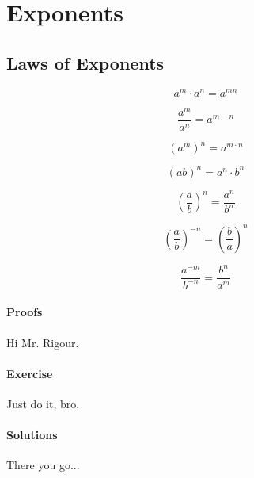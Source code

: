 \section{Exponents}

\subsection*{Laws of Exponents}
$$
a^{m} \cdot a^{n} = a^{mn}
$$

$$
\frac{a^{m}}{a^{n}} = a^{m-n}
$$

$$
\left( a^{m} \right)^{n} = a^{m \cdot n}
$$

$$
\left( ab \right)^{n} = a^{n} \cdot b^{n}
$$

$$
\left( \frac{a}{b} \right) ^{n} = \frac{a^{n}}{b^{n}}
$$

$$
\left( \frac{a}{b} \right)^{-n} = \left( \frac{b}{a} \right)^{n}
$$

$$
\frac{a^{-m}}{b^{-n}} = \frac{b^{n}}{a^{m}}
$$

\paragraph*{Proofs}

Hi Mr. Rigour.

\paragraph*{Exercise}

Just do it, bro.

\paragraph*{Solutions}

There you go...
